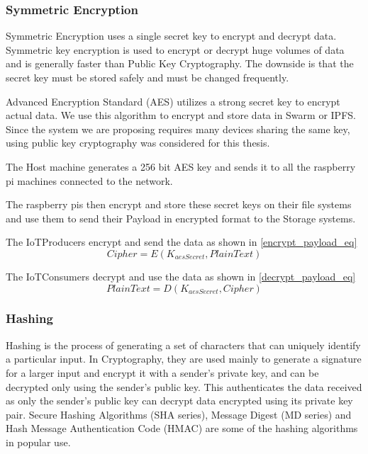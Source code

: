 \documentclass[11pt,openright]{report}
\begin{document}
\subsubsection{Symmetric Encryption}
Symmetric Encryption uses a single secret key to encrypt and decrypt data. Symmetric key encryption is used to encrypt or decrypt huge volumes of data and is generally faster than Public Key Cryptography. The downside is that the secret key must be stored safely and must be changed frequently.

Advanced Encryption Standard (AES) utilizes a strong secret key to encrypt actual data. We use this algorithm to encrypt and store data in Swarm or IPFS. Since the system we are proposing requires many devices sharing the same key, using public key cryptography was considered for this thesis.

The Host machine generates a 256 bit AES key and sends it to all the raspberry pi machines connected to the network.

The raspberry pis then encrypt and store these secret keys on their file systems and use them to send their Payload in encrypted format to the Storage systems.

The IoTProducers encrypt and send the data as shown in \ref{encrypt_payload_eq}
\begin{equation}\label{encrypt_payload_eq}
    Cipher = E(K_{aesSecret}, PlainText)
\end{equation}

The IoTConsumers decrypt and use the data as shown in \ref{decrypt_payload_eq}
\begin{equation}\label{decrypt_payload_eq}
    PlainText = D(K_{aesSecret}, Cipher)
\end{equation}

\subsubsection{Hashing}
Hashing is the process of generating a set of characters that can uniquely identify a particular input. In Cryptography, they are used mainly to generate a signature for a larger input and encrypt it with a sender's private key, and can be decrypted only using the sender's public key. This authenticates the data received as only the sender's public key can decrypt data encrypted using its private key pair. Secure Hashing Algorithms (SHA series), Message Digest (MD series) and Hash Message Authentication Code (HMAC) are some of the hashing algorithms in popular use.
\end{document}
